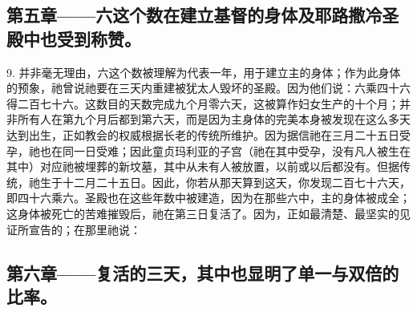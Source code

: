 
\subsection{第五章——六这个数在建立基督的身体及耶路撒冷圣殿中也受到称赞。}

9. 并非毫无理由，六这个数被理解为代表一年，用于建立主的身体；作为此身体的预象，祂曾说祂要在三天内重建被犹太人毁坏的圣殿。因为他们说：六乘四十六得二百七十六。这数目的天数完成九个月零六天，这被算作妇女生产的十个月；并非所有人在第九个月后都到第六天，而是因为主身体的完美本身被发现在这么多天达到出生，正如教会的权威根据长老的传统所维护。因为据信祂在三月二十五日受孕，祂也在同一日受难；因此童贞玛利亚的子宫（祂在其中受孕，没有凡人被生在其中）对应祂被埋葬的新坟墓，其中从未有人被放置，以前或以后都没有。但据传统，祂生于十二月二十五日。因此，你若从那天算到这天，你发现二百七十六天，即四十六乘六。圣殿也在这些年数中被建造，因为在那些六中，主的身体被成全；这身体被死亡的苦难摧毁后，祂在第三日复活了。因为，正如最清楚、最坚实的见证所宣告的；在那里祂说：\par


\subsection{第六章——复活的三天，其中也显明了单一与双倍的比率。}

